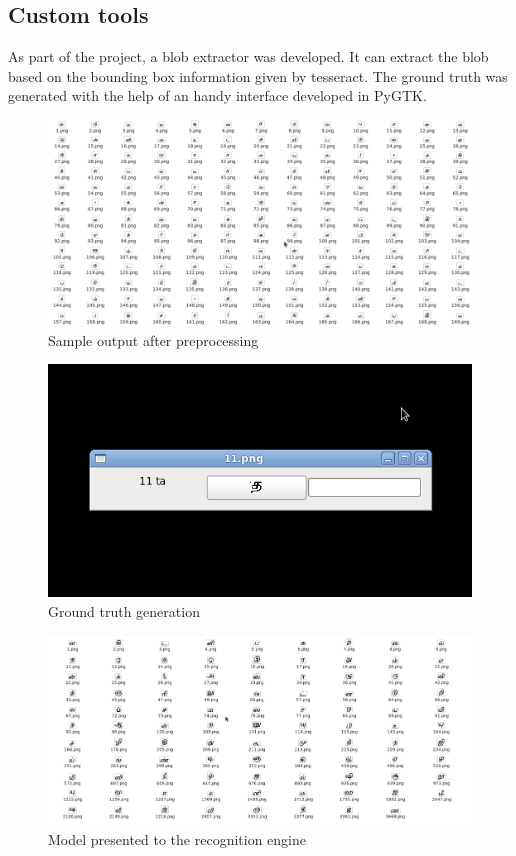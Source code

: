 \subsection{Custom tools}
As part of the project, a blob extractor was developed. It can extract the blob based on the bounding
box information given by tesseract. The ground truth was generated with the help of
an handy interface developed in PyGTK.
  \begin{figure}\centering
\includegraphics[scale=0.3]{./img/blobs} 
  \caption{Sample output after preprocessing}\label{BLOBIMG}
\end{figure}


\begin{figure}\centering
\includegraphics[scale=0.5]{./img/train} 
  \caption{Ground truth generation}\label{GRTR}
\end{figure}

\begin{figure}\centering
\includegraphics[scale=0.3]{./img/model} 
  \caption{Model presented to the recognition engine}\label{MODEL}
  \end{figure}

